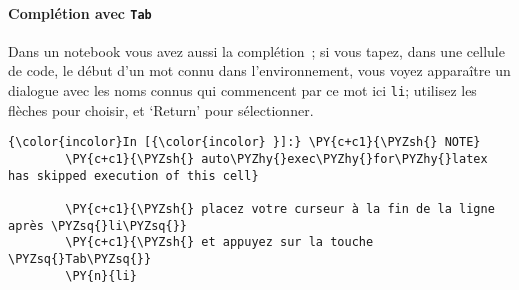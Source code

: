     \hypertarget{compluxe9tion-avec-tab}{%
\paragraph{\texorpdfstring{Complétion avec
\texttt{Tab}}{Complétion avec Tab}}\label{compluxe9tion-avec-tab}}

    Dans un notebook vous avez aussi la complétion~; si vous tapez, dans une
cellule de code, le début d'un mot connu dans l'environnement, vous
voyez apparaître un dialogue avec les noms connus qui commencent par ce
mot ici \texttt{li}; utilisez les flèches pour choisir, et `Return' pour
sélectionner.

    \begin{Verbatim}[commandchars=\\\{\}]
{\color{incolor}In [{\color{incolor} }]:} \PY{c+c1}{\PYZsh{} NOTE}
        \PY{c+c1}{\PYZsh{} auto\PYZhy{}exec\PYZhy{}for\PYZhy{}latex has skipped execution of this cell}
        
        \PY{c+c1}{\PYZsh{} placez votre curseur à la fin de la ligne après \PYZsq{}li\PYZsq{}}
        \PY{c+c1}{\PYZsh{} et appuyez sur la touche \PYZsq{}Tab\PYZsq{}}
        \PY{n}{li}
\end{Verbatim}



    
    
    
